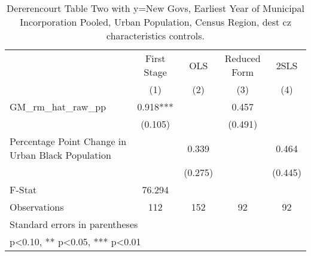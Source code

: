 \begin{table}[htbp]\centering
\def\sym#1{\ifmmode^{#1}\else\(^{#1}\)\fi}
\caption{Dererencourt Table Two with y=New Govs, Earliest Year of Municipal Incorporation  Pooled, Urban Population, Census Region, dest cz characteristics controls.}
\begin{tabular}{l*{4}{c}}
\toprule
                    & First Stage   &         OLS   &Reduced Form   &        2SLS   \\
                    &\multicolumn{1}{c}{(1)}   &\multicolumn{1}{c}{(2)}   &\multicolumn{1}{c}{(3)}   &\multicolumn{1}{c}{(4)}   \\
\midrule
GM\_rm\_hat\_raw\_pp    &       0.918***&               &       0.457   &               \\
                    &     (0.105)   &               &     (0.491)   &               \\
\addlinespace
Percentage Point Change in Urban Black Population&               &       0.339   &               &       0.464   \\
                    &               &     (0.275)   &               &     (0.445)   \\
\midrule
F-Stat              &      76.294   &               &               &               \\
Observations        &         112   &         152   &          92   &          92   \\
\bottomrule
\multicolumn{5}{l}{\footnotesize Standard errors in parentheses}\\
\multicolumn{5}{l}{\footnotesize * p<0.10, ** p<0.05, *** p<0.01}\\
\end{tabular}
\end{table}
